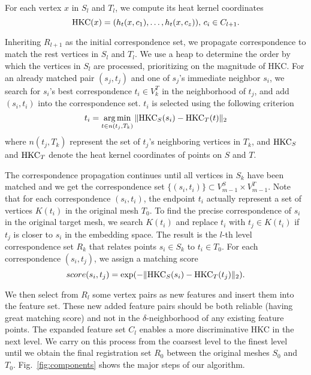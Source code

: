 For each vertex $x$ in $S_l$ and $T_l$, we compute its heat kernel coordinates
\begin{equation}
\operatorname*{HKC}(x)=(h_t(x,c_1),\dots,h_t(x,c_z)) \mbox{, } c_i\in C_{l+1}.
\end{equation}

Inheriting $R_{l+1}$ as the initial correspondence set, we propagate correspondence to match the rest vertices in $S_l$ and $T_l$. We use a heap to determine the order by which the vertices in $S_l$ are processed, prioritizing on the magnitude of HKC. For an already matched pair $(s_j, t_j)$ and one of $s_j$'s immediate neighbor $s_i$, we search for $s_i$'s best correspondence $t_i \in V^T_k$ in the neighborhood of $t_j$, and add $(s_i,t_i)$ into the correspondence set. $t_i$ is selected using the following criterion
\begin{equation}
t_i=\operatorname*{arg\,min}_{t\in n(t_j,T_k)}\|{\operatorname*{HKC}}_S(s_i)-{\operatorname*{HKC}}_T(t)\|_2
\end{equation}
where $n(t_j,T_k)$ represent the set of $t_j$'s neighboring vertices in $T_k$, and $\operatorname*{HKC}_S$ and $\operatorname*{HKC}_T$ denote the heat kernel coordinates of points on $S$ and $T$.

The correspondence propagation continues until all vertices in $S_k$ have been matched and we get the correspondence set $\{(s_i,t_i)\} \subset V^S_{m-1} \times V^T_{m-1}$. Note that for each correspondence $(s_i,t_i)$, the endpoint $t_i$ actually represent a set of vertices $K(t_i)$ in the original mesh $T_0$. To find the precise correspondence of $s_i$ in the original target mesh, we search $K(t_i)$ and replace $t_i$ with $t_j \in K(t_i)$ if $t_j$ is closer to $s_i$ in the embedding space. The result is the $l$-th level correspondence set $R_k$ that relates points $s_i \in S_k$ to $t_i \in T_0$. For each correspondence $(s_i,t_j)$, we assign a matching score
\begin{equation}
score(s_i,t_j)=\exp(-\|{\operatorname*{HKC}}_S(s_i)-{\operatorname*{HKC}}_T(t_j)\|_2).
\end{equation}

We then select from $R_l$ some vertex pairs as new features and insert them into the feature set. These new added feature pairs should be both reliable (having great matching score) and not in the $\delta$-neighborhood of any existing feature points. The expanded feature set $C_l$ enables a more discriminative HKC in the next level. We carry on this process from the coarsest level to the finest level until we obtain the final registration set $R_0$ between the original meshes $S_0$ and $T_0$. 
Fig.~\ref{fig:components} shows the major steps of our algorithm.

